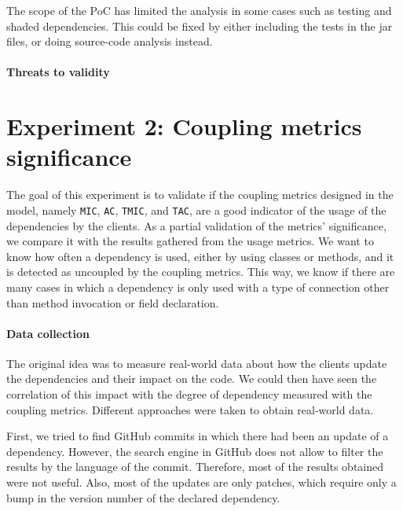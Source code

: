 \begin{finding}
	The scope of the PoC has limited the analysis in some cases such as testing and shaded dependencies. This could be fixed by either including the tests in the jar files, or doing source-code analysis instead.
	\label{find:source-code-analysis}
\end{finding}

\paragraph{Threats to validity}

\section{Experiment 2: Coupling metrics significance}\label{sec:experiment2}

The goal of this experiment is to validate if the coupling metrics designed in the model, namely \texttt{MIC}, \texttt{AC}, \texttt{TMIC}, and \texttt{TAC}, are a good indicator of the usage of the dependencies by the clients. As a partial validation of the metrics' significance, we compare it with the results gathered from the usage metrics. We want to know how often a dependency is used, either by using classes or methods, and it is detected as uncoupled by the coupling metrics. This way, we know if there are many cases in which a dependency is only used with a type of connection other than method invocation or field declaration.

\paragraph{Data collection}
The original idea was to measure real-world data about how the clients update the dependencies and their impact on the code. We could then have seen the correlation of this impact with the degree of dependency measured with the coupling metrics. Different approaches were taken to obtain real-world data.

First, we tried to find GitHub commits in which there had been an update of a dependency. However, the search engine in GitHub does not allow to filter the results by the language of the commit. Therefore, most of the results obtained were not useful. Also, most of the updates are only patches, which require only a bump in the version number of the declared dependency.

